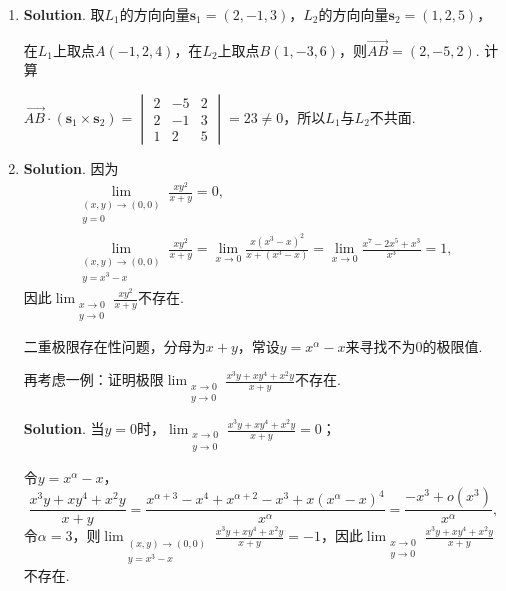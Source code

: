 \documentclass[../main.tex]{subfiles}
\begin{document}
\begin{enumerate}
    \item \textbf{Solution}. 取$L_{1}$的方向向量$\boldsymbol{s}_{1} =(2,-1,3)$，$L
                  _{2}$的方向向量$\boldsymbol{s}_{2} =(1,2,5)$，

          在$L_{1}$上取点$A(-1,2,4)$，在$L_{2}$上取点$B(1,-3,6)$，则$\overrightarrow{AB}
              = (2,-5,2)$. 计算

          $\overrightarrow{AB}\cdot \left(\boldsymbol{s}_{1} \times \boldsymbol{s}_{2}
              \right) =
              \begin{vmatrix}
                  2 & -5 & 2 \\
                  2 & -1 & 3 \\
                  1 & 2  & 5
              \end{vmatrix}
              = 23\neq0$，所以$L_{1}$与$L_{2}$不共面.

    \item \textbf{Solution}. 因为
          \[
              \begin{gathered}
                  \lim_{\substack{(x,y)\to (0,0) \\ y = 0}}\frac{xy^{2}}{x+y}= 0,\\
                  \lim_{\substack{(x,y)\to (0,0) \\ y=x^3-x}}\frac{x y^{2}}{x+y}= \lim_{x\to0}
                  \frac{x(x^{3}-x)^{2}}{x+(x^{3}-x)}= \lim_{x\to0}\frac{x^{7}-2x^{5}+x^{3}}{x^{3}}
                  =1,
              \end{gathered}
          \]
          因此$\lim_{\substack{x\to 0 \\ y\to 0}}\frac{x y^{2}}{x+y}$不存在.

          二重极限存在性问题，分母为$x+y$，常设$y = x^{\alpha}- x$来寻找不为0的极限值.

          再考虑一例：证明极限$\lim_{\substack{x\to 0 \\ y\to 0}}\frac{x^{3}y+xy^{4}+x^{2}y}{x+y}$不存在.

          \textbf{Solution}. 当$y=0$时，$\lim_{\substack{x\to 0 \\ y\to 0}}\frac{x^{3}y+xy^{4}+x^{2}y}{x+y}
              = 0$；

          令$y = x^{\alpha}- x$，
          \[
              \frac{x^{3}y+xy^{4}+x^{2}y}{x+y}= \frac{x^{\alpha
                          + 3}-x^{4}+x^{\alpha + 2}-x^{3}+x\left(x^{\alpha}-x\right)^{4}}{x^{\alpha}}
              = \frac{-x^{3} + o(x^{3})}{x^{\alpha}},
          \]
          令$\alpha = 3$，则$\lim_{\substack{(x,y)\to (0,0) \\ y = x^3-x}}\frac{x^{3}y+xy^{4}+x^{2}y}{x+y}
              = -1$，因此$\lim_{\substack{x\to 0 \\ y\to 0}}\frac{x^{3}y+xy^{4}+x^{2}y}{x+y}$不存在.


\end{enumerate}
\end{document}
